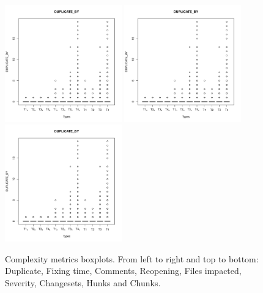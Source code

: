 \begin{figure}
\centering
\includegraphics[page=7, width=0.45\textwidth]{extract/Rplots}
\includegraphics[page=8, width=0.45\textwidth]{extract/Rplots} \\
\includegraphics[page=9, width=0.45\textwidth]{extract/Rplots}

\caption{Complexity metrics boxplots. From left to right and top to bottom: Duplicate, Fixing time, Comments, Reopening, Files impacted, Severity, Changesets, Hunks and Chunks.
\label{fig:boxplots}}

\end{figure}






